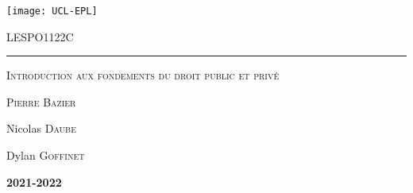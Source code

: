 \documentclass{customSynthesis}
\begin{document}

\begin{titlepage}
	\flushleft\texttt{[image: UCL-EPL]}\\
	\vspace*{2cm}
	\vspace*{\fill}
	\centering
	{\scshape\LARGE LESPO1122C \par}
	\vspace{0.4cm}
	{\color{clearBlue}\rule{0.7\textwidth}{1pt}\par}
	\vspace{0.5cm}
	{\scshape\Large Introduction aux fondements du droit public et privé \par}
	\vspace{0.5cm}
	{\scshape\large Pierre Bazier\par}
	\vspace{1cm}
	{\scshape\large \par}
	{\Large\itshape\par}
	\vspace*{\fill}
	\vfill
	\vfill
	{\Large Nicolas \textsc{Daube}\par}
	{\Large Dylan \textsc{Goffinet}\par}
	\vspace{0.5cm}
	{\Large\bfseries 2021-2022\par}
	{\large \par}
\end{titlepage}


\setcounter{tocdepth}{2} %
\tableofcontents
\thispagestyle{empty} %
\clearpage
{}




\end{document}
